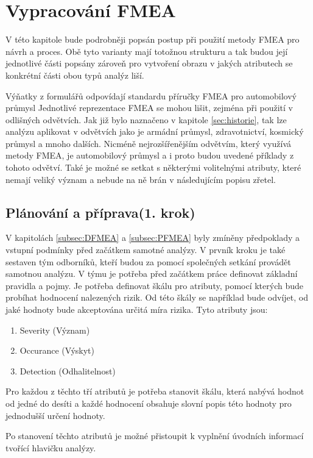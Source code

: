 \chapter{Vypracování FMEA }
\label{sec:FMEA_postup}
V této kapitole bude podrobněji popsán postup při použití metody FMEA pro návrh a proces. Obě tyto varianty mají totožnou strukturu a tak budou její jednotlivé části popsány zároveň pro vytvoření obrazu v jakých atributech se konkrétní části obou typů analýz liší. 

Výňatky z formulářů odpovídají standardu příručky FMEA pro automobilový průmysl\cite{fmeaHandbook} Jednotlivé reprezentace FMEA se mohou lišit, zejména při použití v odlišných odvětvích. Jak již bylo naznačeno v kapitole \ref{sec:historie}, tak lze analýzu aplikovat v odvětvích jako je armádní průmysl, zdravotnictví, kosmický průmysl a mnoho dalších. Nicméně nejrozšířenějším odvětvím, který využívá metody FMEA, je automobilový průmysl a i proto budou uvedené příklady z tohoto odvětví. Také je možné se setkat s některými volitelnými atributy, které nemají veliký význam a nebude na ně brán v následujícím popisu zřetel.  

\section{Plánování a příprava(1. krok)}
V kapitolách \ref{subsec:DFMEA} a \ref{subsec:PFMEA}  byly zmíněny předpoklady a vstupní podmínky před začátkem samotné analýzy. V prvník kroku je také sestaven tým odborníků, kteří budou za pomocí společných setkání provádět samotnou analýzu. V týmu je potřeba před začátkem práce definovat základní pravidla a pojmy. Je potřeba definovat škálu pro atributy, pomocí kterých bude probíhat hodnocení nalezených rizik. Od této škály se například bude odvíjet, od jaké hodnoty bude akceptována určitá míra rizika. Tyto atributy jsou: 

\begin{enumerate}
	\item Severity (Význam)
	\item Occurance (Výskyt)
	\item Detection (Odhalitelnost)
\end{enumerate}

Pro každou z těchto tří atributů je potřeba stanovit škálu, která nabývá hodnot od jedné do desíti a každé hodnocení obsahuje slovní popis této hodnoty pro jednodušší určení hodnoty. 

Po stanovení těchto atributů je možné přistoupit k vyplnění úvodních informací tvořící hlavičku analýzy. 

